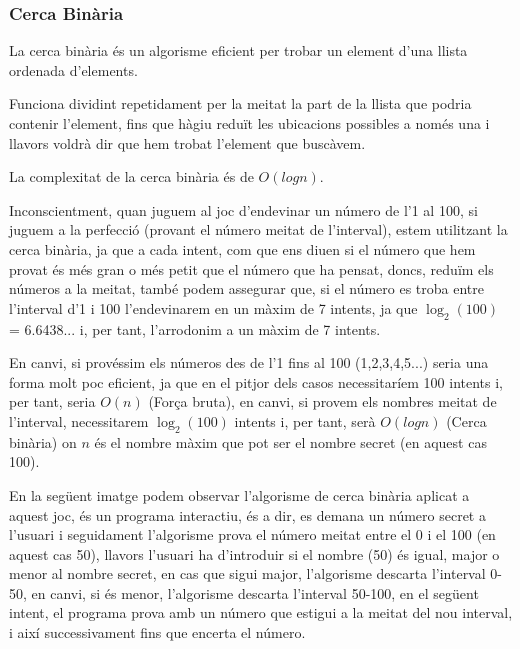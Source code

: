 \subsubsection{Cerca Binària}

La cerca binària és un algorisme eficient per trobar un element d'una llista ordenada d'elements.

Funciona dividint repetidament per la meitat la part de la llista que podria contenir l'element, fins que hàgiu reduït les ubicacions possibles a només una i llavors voldrà dir que hem trobat l'element que buscàvem.

\newline
La complexitat de la cerca binària és de $O(log n)$.

Inconscientment, quan juguem al joc d'endevinar un número de l'1 al 100, si juguem a la perfecció (provant el número meitat de l'interval), estem utilitzant la cerca binària, ja que a cada intent, com que ens diuen si el número que hem provat és més gran o més petit que el número que ha pensat, doncs, reduïm els números a la meitat, també podem assegurar que, si el número es troba entre l'interval d'1 i 100 l'endevinarem en un màxim de 7 intents, ja que $\log_{2}(100)$ = 6.6438... i, per tant, l'arrodonim a un màxim de 7 intents. \newline

En canvi, si provéssim els números des de l'1 fins al 100 (1,2,3,4,5...) seria una forma molt poc eficient, ja que en el pitjor dels casos necessitaríem 100 intents i, per tant, seria $O(n)$ (Força bruta), en canvi, si provem els nombres meitat de l'interval, necessitarem $\log_{2}(100)$ intents i, per tant, serà $O(log n)$ (Cerca binària) on $n$ és el nombre màxim que pot ser el nombre secret (en aquest cas 100). \newline

En la següent imatge podem observar l'algorisme de cerca binària aplicat a aquest joc, és un programa interactiu, és a dir, es demana un número secret a l'usuari i seguidament l'algorisme prova el número meitat entre el 0 i el 100 (en aquest cas 50), llavors l'usuari ha d'introduir si el nombre (50) és igual, major o menor al nombre secret, en cas que sigui major, l'algorisme descarta l'interval 0-50, en canvi, si és menor, l'algorisme descarta l'interval 50-100, en el següent intent, el programa prova amb un número que estigui a la meitat del nou interval, i així successivament fins que encerta el número.

\newpage

